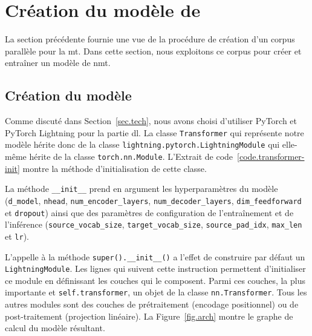 \section{Création du modèle de }
\label{sec.mt-model-creation}

La section précédente fournie une vue de la procédure de création d'un corpus parallèle pour la \gls{mt}.
Dans cette section, nous exploitons ce corpus pour créer et entraîner un modèle de \gls{nmt}.

\subsection{Création du modèle}
\label{subsec.mt-model-creation}

Comme discuté dans Section~\ref{sec.tech}, 
nous avons choisi d'utiliser PyTorch et \foreignlanguage{english}{PyTorch Lightning} pour la partie \gls{dl}.
La classe \verb|Transformer| qui représente notre modèle hérite donc de la classe
\verb|lightning.pytorch.LightningModule| qui elle-même hérite de la classe \verb|torch.nn.Module|.
L'Extrait de code~\ref{code.transformer-init} montre la méthode d'initialisation de cette classe.



La méthode \verb|__init__| prend en argument les hyperparamètres du modèle
(\verb|d_model|, \verb|nhead|, \verb|num_encoder_layers|, 
\verb|num_decoder_layers|, \verb|dim_feedforward| et \verb|dropout|)
ainsi que des paramètres de configuration de l'entraînement et de l'inférence
(\verb|source_vocab_size|, \verb|target_vocab_size|, \verb|source_pad_idx|, \verb|max_len| et \verb|lr|).

L'appelle à la méthode \verb|super().__init__()| a l'effet de construire par défaut un \verb|LightningModule|.
Les lignes qui suivent cette instruction permettent d'initialiser ce module 
en définissant les couches qui le composent.
Parmi ces couches, la plus importante et \verb|self.transformer|,
un objet de la classe \verb|nn.Transformer|.
Tous les autres modules sont des couches de prétraitement (encodage positionnel)
ou de post-traitement (projection linéaire).
La Figure~\ref{fig.arch} montre le graphe de calcul du modèle résultant.

